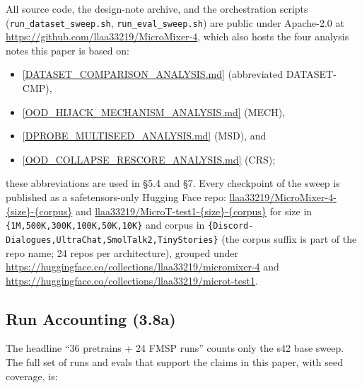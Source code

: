 \documentclass[11pt]{article}
\begin{document}
All source code, the design-note archive, and the orchestration scripts (\texttt{run\_dataset\_sweep.sh}, \texttt{run\_eval\_sweep.sh}) are public under Apache-2.0 at \url{https://github.com/llaa33219/MicroMixer-4}, which also hosts the four analysis notes this paper is based on:
\begin{itemize}
\item \href{https://github.com/llaa33219/MicroMixer-4/blob/4bb630413dfa58ef3141291e121ab8c006d03235/DATASET_COMPARISON_ANALYSIS.md}{[DATASET\_COMPARISON\_ANALYSIS.md]} (abbreviated DATASET-CMP),
\item \href{https://github.com/llaa33219/MicroMixer-4/blob/4bb630413dfa58ef3141291e121ab8c006d03235/OOD_HIJACK_MECHANISM_ANALYSIS.md}{[OOD\_HIJACK\_MECHANISM\_ANALYSIS.md]} (MECH),
\item \href{https://github.com/llaa33219/MicroMixer-4/blob/4bb630413dfa58ef3141291e121ab8c006d03235/DPROBE_MULTISEED_ANALYSIS.md}{[DPROBE\_MULTISEED\_ANALYSIS.md]} (MSD), and
\item \href{https://github.com/llaa33219/MicroMixer-4/blob/4bb630413dfa58ef3141291e121ab8c006d03235/OOD_COLLAPSE_RESCORE_ANALYSIS.md}{[OOD\_COLLAPSE\_RESCORE\_ANALYSIS.md]} (CRS);
\end{itemize}
these abbreviations are used in \S5.4 and \S7. Every checkpoint of the sweep is published as a safetensors-only Hugging Face repo: \url{llaa33219/MicroMixer-4-{size}-{corpus}} and \url{llaa33219/MicroT-test1-{size}-{corpus}} for size in \texttt{\{1M,500K,300K,100K,50K,10K\}} and corpus in \texttt{\{Discord-Dialogues,\allowbreak UltraChat,\allowbreak SmolTalk2,\allowbreak TinyStories\}} (the corpus suffix is part of the repo name; 24 repos per architecture), grouped under \url{https://huggingface.co/collections/llaa33219/micromixer-4} and \url{https://huggingface.co/collections/llaa33219/microt-test1}.

\subsection{Run Accounting (3.8a)}

The headline ``36 pretrains + 24 FMSP runs'' counts only the s42 base sweep. The full set of runs and evals that support the claims in this paper, with seed coverage, is:
\end{document}
